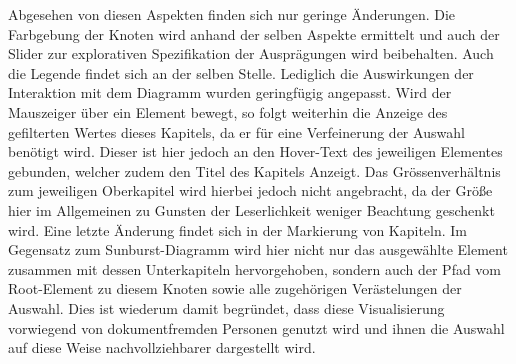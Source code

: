 Abgesehen von diesen Aspekten finden sich nur geringe \"Anderungen. Die Farbgebung der Knoten wird anhand der selben Aspekte ermittelt und auch der Slider zur explorativen Spezifikation der Auspr\"agungen wird beibehalten. Auch die Legende findet sich an der selben Stelle. Lediglich die Auswirkungen der Interaktion mit dem Diagramm wurden geringf\"ugig angepasst. Wird der Mauszeiger \"uber ein Element bewegt, so folgt weiterhin die Anzeige des gefilterten Wertes dieses Kapitels, da er f\"ur eine Verfeinerung der Auswahl ben\"otigt wird. Dieser ist hier jedoch an den Hover-Text des jeweiligen Elementes gebunden, welcher zudem den Titel des Kapitels Anzeigt. Das Gr\"o{ss}enverh\"altnis zum jeweiligen Oberkapitel wird hierbei jedoch nicht angebracht, da der Gr\"o{\ss}e hier im Allgemeinen zu Gunsten der Leserlichkeit weniger Beachtung geschenkt wird. Eine letzte \"Anderung findet sich in der Markierung von Kapiteln. Im Gegensatz zum Sunburst-Diagramm wird hier nicht nur das ausgew\"ahlte Element zusammen mit dessen Unterkapiteln hervorgehoben, sondern auch der Pfad vom Root-Element zu diesem Knoten sowie alle zugeh\"origen Ver\"astelungen der Auswahl. Dies ist wiederum damit begr\"undet, dass diese Visualisierung vorwiegend von dokumentfremden Personen genutzt wird und ihnen die Auswahl auf diese Weise nachvollziehbarer dargestellt wird.


